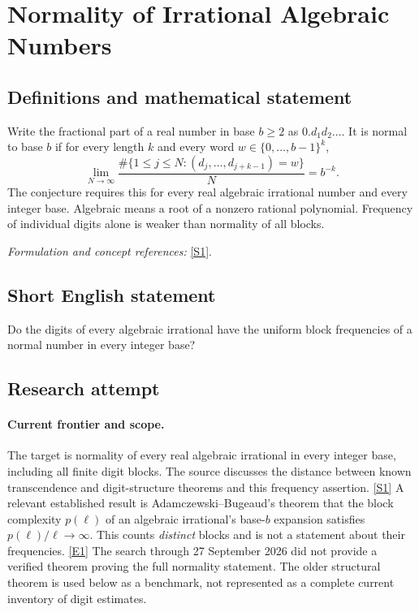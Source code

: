 \documentclass[11pt,a4paper]{article}
\newcommand{\sref}[2]{\hyperlink{source:#1:#2}{[S#2]}}
\newcommand{\eref}[2]{\hyperlink{extra:#1:#2}{[E#2]}}
\newif\ifshowcatalogue
\newcommand{\cataloguescope}[1]{\ifshowcatalogue
 \paragraph{Exact scope in the supplied catalogue.}
 \begin{quote}\small #1\end{quote}\fi}
\numberwithin{equation}{section}
\begin{document}
\setcounter{section}{0}
\setlength{\parskip}{3pt plus 1pt}
\clearpage
\section*{\texorpdfstring{Normality of Irrational Algebraic Numbers}{Normality of Irrational Algebraic Numbers}}\label{1259}
\subsection{Definitions and mathematical statement}
Write the fractional part of a real number in base $b\ge2$ as $0.d_1d_2\ldots$. It is normal to base $b$ if for every length $k$ and every word $w\in\{0,\ldots,b-1\}^k$,
\[
 \lim_{N\to\infty}\frac{\#\{1\le j\le N:(d_j,\ldots,d_{j+k-1})=w\}}{N}=b^{-k}.
\]
The conjecture requires this for every real algebraic irrational number and every integer base. Algebraic means a root of a nonzero rational polynomial. Frequency of individual digits alone is weaker than normality of all blocks.
\par\smallskip\textit{Formulation and concept references:} \sref{1259}{1}.
\cataloguescope{Prove or disprove that every real irrational algebraic number is normal to every integer base b >= 2.}
\subsection{Short English statement}
Do the digits of every algebraic irrational have the uniform block frequencies of a normal number in every integer base?
\subsection{Research attempt}

\paragraph{Current frontier and scope.}
The target is normality of every real algebraic irrational in every
integer base, including all finite digit blocks.  The source discusses
the distance between known transcendence and digit-structure theorems
and this frequency assertion. \sref{1259}{1}
A relevant established result is Adamczewski--Bugeaud's theorem that
the block complexity $p(\ell)$ of an algebraic irrational's base-$b$
expansion satisfies $p(\ell)/\ell\to\infty$.  This counts \emph{distinct}
blocks and is not a statement about their frequencies.
\eref{1259}{1}  The search through 27 September 2026 did not provide a
verified theorem proving the full normality statement.  The older
structural theorem is used below as a benchmark, not represented as
a complete current inventory of digit estimates.
\end{document}

